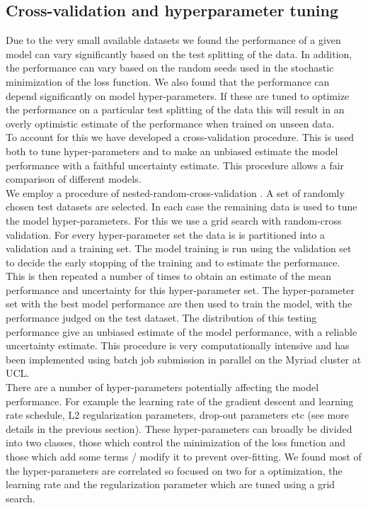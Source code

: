 \documentclass[NOTE, disdraft=true, UKenglish]{\DISCDTLATEXPATH UCLCDTDISdoc}
\begin{document}
\subsection{Cross-validation and hyperparameter tuning}
Due to the very small available datasets we found the performance of a given model can vary significantly based on the test splitting of the data. In addition, the performance can vary based on the random seeds used in the stochastic minimization of the loss function. We also found that the performance can depend significantly on model hyper-parameters. If these are tuned to optimize the performance on a particular test splitting of the data this will result in an overly optimistic estimate of the performance when trained on unseen data.
\\ \indent To account for this we have developed a cross-validation procedure. This is used both to tune hyper-parameters and to make an unbiased estimate the model performance with a faithful uncertainty estimate. This procedure allows a fair comparison of different models.
\\ \indent We employ a procedure of nested-random-cross-validation \cite{cross_validate}. A set of randomly chosen test datasets  are selected. In each case the remaining data is used to tune the model hyper-parameters. For this we use a grid search with random-cross validation. For every hyper-parameter set the data is is partitioned into a validation and a training set. The model training is run using the validation set to decide the early stopping of the training and to estimate the performance. This is then repeated a number of times to obtain an estimate of the mean performance and uncertainty for this hyper-parameter set. The hyper-parameter set with the best model performance are then used to train the model, with the performance judged on the test dataset. The distribution of this testing performance give an unbiased estimate of the model performance, with a reliable uncertainty estimate. This procedure is very computationally intensive and has been implemented using batch job submission in parallel on the Myriad cluster at UCL.
\\ \indent There are a number of hyper-parameters potentially affecting the model performance. For example the learning rate of the gradient descent and learning rate schedule, L2 regularization parameters, drop-out parameters etc (see more details in the previous section). 
These hyper-parameters can broadly be divided into two classes, those which control the minimization of the loss function and those which add some terms / modify it to prevent over-fitting. We found most of the hyper-parameters are correlated so focused on two for a optimization, the learning rate and the regularization parameter which are tuned using a grid search.  
\end{document}
